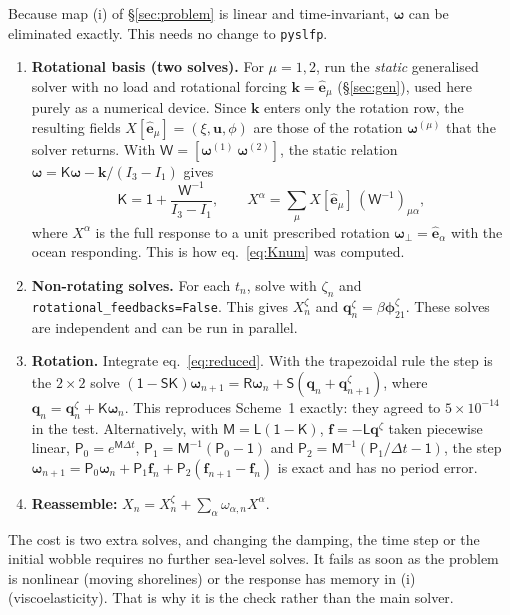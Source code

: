 \documentclass[11pt,a4paper]{article}
\newcommand{\bw}{\bm{\omega}}
\newcommand{\bu}{\mathbf{u}}
\newcommand{\bk}{\mathbf{k}}
\newcommand{\bq}{\mathbf{q}}
\newcommand{\be}{\hat{\mathbf{e}}}
\newcommand{\Id}{\mathsf{1}}
\newcommand{\R}{\mathsf{R}}
\newcommand{\Sm}{\mathsf{S}}
\newcommand{\K}{\mathsf{K}}
\newcommand{\W}{\mathsf{W}}
\begin{document}
Because map (i) of \S\ref{sec:problem} is linear and time-invariant, $\bw$ can be eliminated exactly.
This needs no change to \texttt{pyslfp}.
\begin{enumerate}
  \item \textbf{Rotational basis (two solves).} For $\mu=1,2$, run the \emph{static} generalised
  solver with no load and rotational forcing $\bk=\be_\mu$ (\S\ref{sec:gen}), used here purely as a
  numerical device. Since $\bk$ enters only the rotation row, the resulting
  fields $X[\be_\mu]=(\xi,\bu,\phi)$ are those of the rotation
  $\bw^{(\mu)}$ that the solver returns. With $\W=[\bw^{(1)}\ \bw^{(2)}]$, the static relation
  $\bw=\K\bw-\bk/(I_3-I_1)$ gives
  \begin{equation}
    \K=\Id+\frac{\W^{-1}}{I_3-I_1},\qquad
    X^\alpha=\sum_\mu X[\be_\mu]\,(\W^{-1})_{\mu\alpha},
    \label{eq:basis}
  \end{equation}
  where $X^\alpha$ is the full response to a unit prescribed rotation $\bw_\perp=\be_\alpha$ with the ocean
  responding. This is how eq.~\eqref{eq:Knum} was computed.
  \item \textbf{Non-rotating solves.} For each $t_n$, solve with $\zeta_n$ and
  \texttt{rotational\_feedbacks=False}. This gives $X^\zeta_n$ and $\bq^\zeta_n=\beta\bm\phi^\zeta_{21}$.
  These solves are independent and can be run in parallel.
  \item \textbf{Rotation.} Integrate eq.~\eqref{eq:reduced}. With the trapezoidal rule the step is
  the $2\times2$ solve $(\Id-\Sm\K)\bw_{n+1}=\R\bw_n+\Sm(\bq_n+\bq^\zeta_{n+1})$, where
  $\bq_n=\bq^\zeta_n+\K\bw_n$. This reproduces Scheme~1 exactly: they agreed to $5\times10^{-14}$ in
  the test. Alternatively, with $\mathsf{M}=\mathsf{L}(\Id-\K)$, $\mathbf{f}=-\mathsf{L}\bq^\zeta$ taken
  piecewise linear, $\mathsf{P}_0=e^{\mathsf{M}\Delta t}$, $\mathsf{P}_1=\mathsf{M}^{-1}(\mathsf{P}_0-\Id)$ and
  $\mathsf{P}_2=\mathsf{M}^{-1}(\mathsf{P}_1/\Delta t-\Id)$, the step
  $\bw_{n+1}=\mathsf{P}_0\bw_n+\mathsf{P}_1\mathbf{f}_n+\mathsf{P}_2(\mathbf{f}_{n+1}-\mathbf{f}_n)$
  is exact and has no period error.
  \item \textbf{Reassemble:} $X_n=X^\zeta_n+\sum_\alpha\omega_{\alpha,n}X^\alpha$.
\end{enumerate}
The cost is two extra solves, and changing the damping, the time step or the initial wobble
requires no further sea-level solves. It fails as soon as the problem is nonlinear (moving
shorelines) or the response has memory in (i) (viscoelasticity). That is why it is the check
rather than the main solver.
\end{document}
